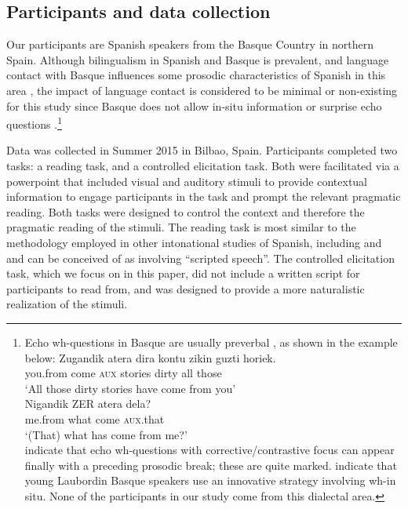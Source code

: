 \documentclass[output=paper,colorlinks,citecolor=brown,draftmode]{langscibook}
\begin{document}
\subsection{Participants and data collection}
Our participants are Spanish speakers from the Basque Country in northern Spain. Although bilingualism in Spanish and Basque is prevalent, and language contact with Basque influences some prosodic characteristics of Spanish in this area \citep{elordieta2020}, the impact of language contact is considered to be minimal or non-existing for this study  since Basque does not allow in-situ information or surprise echo questions \citep{EtxepareOrtiz2003, reglero2003non}.\footnote{Echo wh-questions in Basque are usually preverbal \citet{EtxepareOrtiz2003}, as shown in the example below:
\ea
\ea
\gll Zugandik  atera  dira kontu  zikin guzti horiek.\\
you.from  come  \textsc{aux} stories dirty  all     those\\
\glt‘All those dirty stories have come from you’\\

\ex
\gll Nigandik ZER    atera    dela?\\
me.from  what  come    \textsc{aux}.that\\
\glt‘(That) what has come from me?’ \\
\z
\z
\citet[][463]{EtxepareOrtiz2003} indicate that echo wh-questions with corrective/contrastive focus can appear finally with a preceding prosodic break; these are quite marked. \citet{DuguineIrurtzun2014} indicate that young Laubordin Basque speakers use an innovative strategy involving wh-in situ. None of the participants in our study come from this dialectal area.}

Data was collected in Summer 2015 in Bilbao, Spain. Participants completed two tasks: a reading task, and a controlled elicitation task. Both were facilitated via a powerpoint that included visual and auditory stimuli to provide contextual information to engage participants in the task and prompt the relevant pragmatic reading. Both tasks were designed to control the context and therefore the pragmatic reading of the stimuli. The reading task is most similar to the methodology employed in other intonational studies of Spanish, including \citet{PrietoRoseano2010} and \citet{Rao2013} and can be conceived of as involving ``scripted speech''. The controlled elicitation task, which we focus on in this paper, did not include a written script for participants to read from, and was designed to provide a more naturalistic realization of the stimuli.
\end{document}

